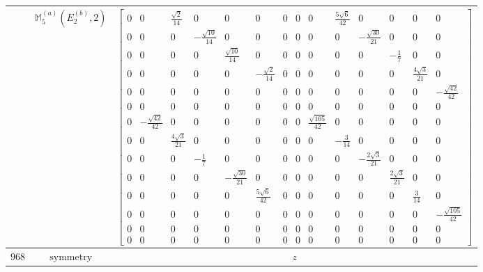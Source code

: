 \documentclass[fleqn,8pt,landscape]{jsarticle}
\begin{document}
\begin{longtable}{ccc}
$  $ & $ \mathbb{M}_{5}^{(a)}(E_{2}^{(b)},2) $ & $ \begin{bmatrix} 0 & 0 & \frac{\sqrt{2}}{14} & 0 & 0 & 0 & 0 & 0 & 0 & \frac{5 \sqrt{6}}{42} & 0 & 0 & 0 & 0 \\ 0 & 0 & 0 & - \frac{\sqrt{10}}{14} & 0 & 0 & 0 & 0 & 0 & 0 & - \frac{\sqrt{30}}{21} & 0 & 0 & 0 \\ 0 & 0 & 0 & 0 & \frac{\sqrt{10}}{14} & 0 & 0 & 0 & 0 & 0 & 0 & - \frac{1}{7} & 0 & 0 \\ 0 & 0 & 0 & 0 & 0 & - \frac{\sqrt{2}}{14} & 0 & 0 & 0 & 0 & 0 & 0 & \frac{4 \sqrt{3}}{21} & 0 \\ 0 & 0 & 0 & 0 & 0 & 0 & 0 & 0 & 0 & 0 & 0 & 0 & 0 & - \frac{\sqrt{42}}{42} \\ 0 & 0 & 0 & 0 & 0 & 0 & 0 & 0 & 0 & 0 & 0 & 0 & 0 & 0 \\ 0 & - \frac{\sqrt{42}}{42} & 0 & 0 & 0 & 0 & 0 & 0 & \frac{\sqrt{105}}{42} & 0 & 0 & 0 & 0 & 0 \\ 0 & 0 & \frac{4 \sqrt{3}}{21} & 0 & 0 & 0 & 0 & 0 & 0 & - \frac{3}{14} & 0 & 0 & 0 & 0 \\ 0 & 0 & 0 & - \frac{1}{7} & 0 & 0 & 0 & 0 & 0 & 0 & - \frac{2 \sqrt{3}}{21} & 0 & 0 & 0 \\ 0 & 0 & 0 & 0 & - \frac{\sqrt{30}}{21} & 0 & 0 & 0 & 0 & 0 & 0 & \frac{2 \sqrt{3}}{21} & 0 & 0 \\ 0 & 0 & 0 & 0 & 0 & \frac{5 \sqrt{6}}{42} & 0 & 0 & 0 & 0 & 0 & 0 & \frac{3}{14} & 0 \\ 0 & 0 & 0 & 0 & 0 & 0 & 0 & 0 & 0 & 0 & 0 & 0 & 0 & - \frac{\sqrt{105}}{42} \\ 0 & 0 & 0 & 0 & 0 & 0 & 0 & 0 & 0 & 0 & 0 & 0 & 0 & 0 \\ 0 & 0 & 0 & 0 & 0 & 0 & 0 & 0 & 0 & 0 & 0 & 0 & 0 & 0 \end{bmatrix} $ \\ \hline
$ 968 $ & $ \text{symmetry} $ & $ z $ \\

\end{longtable}
\end{document}
